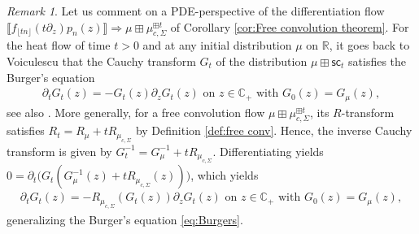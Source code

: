 \documentclass[reqno]{amsart}
\newcommand{\1}{\mathbf{1}}
\newcommand{\C}{\mathbb{C}}
\newcommand{\R}{\mathbb{R}}
\def\R{\mathbb{R}}
\theoremstyle{plain}
\theoremstyle{definition}
\theoremstyle{remark}
\newtheorem{remark}[theorem]{Remark}
\numberwithin{equation}{section}
\begin{document}
\begin{remark}
Let us comment on a PDE-perspective of the differentiation flow $\llbracket f_{\lfloor tn\rfloor}\left(t\partial_{z}\right)p_n(z)\rrbracket\Rightarrow \mu\boxplus\mu_{c,\Sigma}^{\boxplus t}$ of Corollary \ref{cor:Free convolution theorem}. For the heat flow of time $t>0$ and at any initial distribution $\mu$ on $\R$, it goes back to Voiculescu \cite[\S4.7]{voiculescu1990noncommutative} that the Cauchy transform $G_t$ of the distribution $\mu\boxplus\mathsf{sc}_t$ satisfies the Burger's equation 
\begin{align}\label{eq:Burgers} \partial_t G_t(z)=-  G_t(z)\partial_zG_t(z)\text{ on } z\in\C_+\text{ with  } G_0(z)=G_\mu(z),
\end{align}
 see also \cite{Biane,Voiculescu-Dykema-Nica1992}. More generally, for a free convolution flow $\mu\boxplus\mu_{c,\Sigma}^{\boxplus t}$, its $R$-transform satisfies $R_t=R_\mu+tR_{\mu_{c,\Sigma}}$ by Definition \ref{def:free conv}. Hence, the inverse Cauchy transform is given by $G_t^{-1}=G_\mu^{-1}+tR_{\mu_{c,\Sigma}}$. Differentiating yields $0=\partial_t\big( G_t(G_\mu^{-1}(z)+tR_{\mu_{c,\Sigma}}(z))\big)$, which yields
 \begin{align}
\partial_t G_t(z)=-  R_{\mu_{c,\Sigma}}(G_t(z))\partial_zG_t(z)\text{ on } z\in\C_+\text{ with  } G_0(z)=G_\mu(z),
 \end{align}
 generalizing the Burger's equation \eqref{eq:Burgers}. 
\end{remark}
\end{document}
